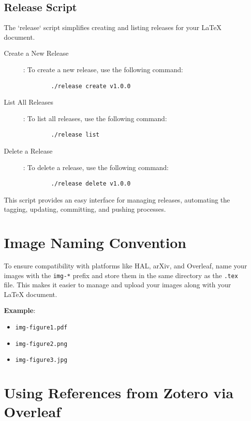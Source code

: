 \documentclass[a4paper]{article}
\begin{document}
\subsection{Release Script}

The `release` script simplifies creating and listing releases for your LaTeX document. 

\begin{description}
    \item[Create a New Release]: To create a new release, use the following command:
    \begin{verbatim}
        ./release create v1.0.0
    \end{verbatim}
    \item[List All Releases]: To list all releases, use the following command:
    \begin{verbatim}
        ./release list
    \end{verbatim}
    \item[Delete a Release]: To delete a release, use the following command:
    \begin{verbatim}
        ./release delete v1.0.0
    \end{verbatim}

\end{description}

This script provides an easy interface for managing releases, automating the tagging, updating, committing, and pushing processes.


\section{Image Naming Convention}

To ensure compatibility with platforms like HAL, arXiv, and Overleaf, name your images with the \texttt{img-*} prefix and store them in the same directory as the \texttt{.tex} file. 
This makes it easier to manage and upload your images along with your LaTeX document.

\textbf{Example}:
\begin{itemize}
    \item \texttt{img-figure1.pdf}
    \item \texttt{img-figure2.png}
    \item \texttt{img-figure3.jpg}
\end{itemize}

\section{Using References from Zotero via Overleaf}
\end{document}
